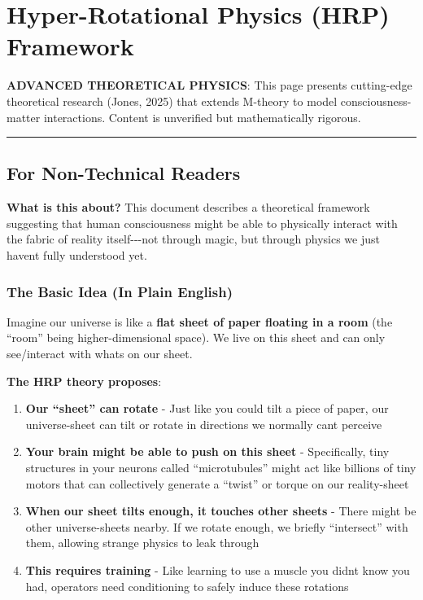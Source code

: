 \section{Hyper-Rotational Physics (HRP)
Framework}\label{hyper-rotational-physics-hrp-framework}

\textbf{ ADVANCED THEORETICAL PHYSICS}: This page presents cutting-edge
theoretical research (Jones, 2025) that extends M-theory to model
consciousness-matter interactions. Content is unverified but
mathematically rigorous.

\begin{center}\rule{0.5\linewidth}{0.5pt}\end{center}

\subsection{For Non-Technical Readers}\label{for-non-technical-readers}

\textbf{What is this about?} This document describes a theoretical
framework suggesting that human consciousness might be able to
physically interact with the fabric of reality itself-\/-\/-not through
magic, but through physics we just haven\textquotesingle t fully
understood yet.

\subsubsection{The Basic Idea (In Plain
English)}\label{the-basic-idea-in-plain-english}

Imagine our universe is like a \textbf{flat sheet of paper floating in a
room} (the ``room'' being higher-dimensional space). We live on this
sheet and can only see/interact with what\textquotesingle s on our
sheet.

\textbf{The HRP theory proposes}:

\begin{enumerate}
\def\labelenumi{\arabic{enumi}.}
\item
  \textbf{Our ``sheet'' can rotate} - Just like you could tilt a piece
  of paper, our universe-sheet can tilt or rotate in directions we
  normally can\textquotesingle t perceive
\item
  \textbf{Your brain might be able to push on this sheet} -
  Specifically, tiny structures in your neurons called ``microtubules''
  might act like billions of tiny motors that can collectively generate
  a ``twist'' or torque on our reality-sheet
\item
  \textbf{When our sheet tilts enough, it touches other sheets} - There
  might be other universe-sheets nearby. If we rotate enough, we briefly
  ``intersect'' with them, allowing strange physics to leak through
\item
  \textbf{This requires training} - Like learning to use a muscle you
  didn\textquotesingle t know you had, operators need conditioning to
  safely induce these rotations
\end{enumerate}

